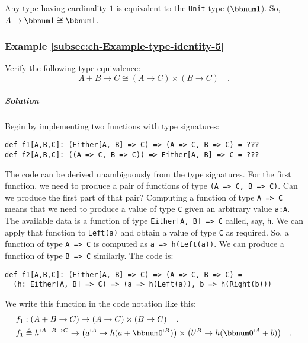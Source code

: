 Any type having cardinality $1$ is equivalent to the \lstinline!Unit!
type ($\bbnum 1$). So, $A\rightarrow\bbnum 1\cong\bbnum 1$.

\subsubsection{Example \label{subsec:ch-Example-type-identity-5}\ref{subsec:ch-Example-type-identity-5}}

Verify the following type equivalence:
\[
A+B\rightarrow C\cong(A\rightarrow C)\times(B\rightarrow C)\quad.
\]


\subparagraph{Solution}

Begin by implementing two functions with type signatures:
\begin{lstlisting}
def f1[A,B,C]: (Either[A, B] => C) => (A => C, B => C) = ???
def f2[A,B,C]: ((A => C, B => C)) => Either[A, B] => C = ???
\end{lstlisting}
The code can be derived unambiguously from the type signatures. For
the first function, we need to produce a pair of functions of type
\lstinline!(A => C, B => C)!. Can we produce the first part of that
pair? Computing a function of type \lstinline!A => C! means that
we need to produce a value of type \lstinline!C! given an arbitrary
value \lstinline!a:A!. The available data is a function of type \lstinline!Either[A, B] => C!
called, say, \lstinline!h!. We can apply that function to \lstinline!Left(a)!
and obtain a value of type \lstinline!C! as required. So, a function
of type \lstinline!A => C! is computed as \lstinline!a => h(Left(a))!.
We can produce a function of type \lstinline!B => C! similarly. The
code is:
\begin{lstlisting}
def f1[A,B,C]: (Either[A, B] => C) => (A => C, B => C) =
  (h: Either[A, B] => C) => (a => h(Left(a)), b => h(Right(b)))
\end{lstlisting}
We write this function in the code notation like this:
\begin{align*}
 & f_{1}:\left(A+B\rightarrow C\right)\rightarrow\left(A\rightarrow C\right)\times\left(B\rightarrow C\right)\quad,\\
 & f_{1}\triangleq h^{:A+B\rightarrow C}\rightarrow\big(a^{:A}\rightarrow h(a+\bbnum 0^{:B})\big)\times\big(b^{:B}\rightarrow h(\bbnum 0^{:A}+b)\big)\quad.
\end{align*}

